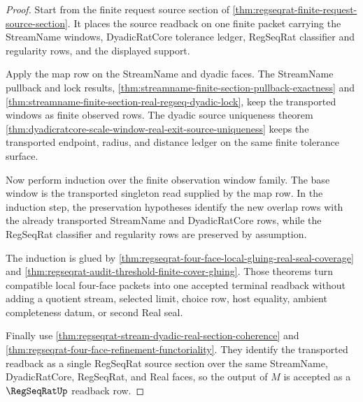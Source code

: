 \begin{proof}
Start from the finite request source section of
\autoref{thm:regseqrat-finite-request-source-section}. It places the source
readback on one finite packet carrying the StreamName windows, DyadicRatCore
tolerance ledger, RegSeqRat classifier and regularity rows, and the displayed
support.

Apply the map row on the StreamName and dyadic faces. The StreamName pullback
and lock results,
\autoref{thm:streamname-finite-section-pullback-exactness} and
\autoref{thm:streamname-finite-section-real-regseq-dyadic-lock}, keep the
transported windows as finite observed rows. The dyadic source uniqueness
theorem \autoref{thm:dyadicratcore-scale-window-real-exit-source-uniqueness}
keeps the transported endpoint, radius, and distance ledger on the same finite
tolerance surface.

Now perform induction over the finite observation window family. The base
window is the transported singleton read supplied by the map row. In the
induction step, the preservation hypotheses identify the new overlap rows
with the already transported StreamName and DyadicRatCore rows, while the
RegSeqRat classifier and regularity rows are preserved by assumption.

The induction is glued by
\autoref{thm:regseqrat-four-face-local-gluing-real-seal-coverage} and
\autoref{thm:regseqrat-audit-threshold-finite-cover-gluing}. Those theorems
turn compatible local four-face packets into one accepted terminal readback
without adding a quotient stream, selected limit, choice row, host equality,
ambient completeness datum, or second Real seal.

Finally use
\autoref{thm:regseqrat-stream-dyadic-real-section-coherence} and
\autoref{thm:regseqrat-four-face-refinement-functoriality}. They identify the
transported readback as a single RegSeqRat source section over the same
StreamName, DyadicRatCore, RegSeqRat, and Real faces, so the output of $M$ is
accepted as a $\RegSeqRatUp$ readback row.
\end{proof}


